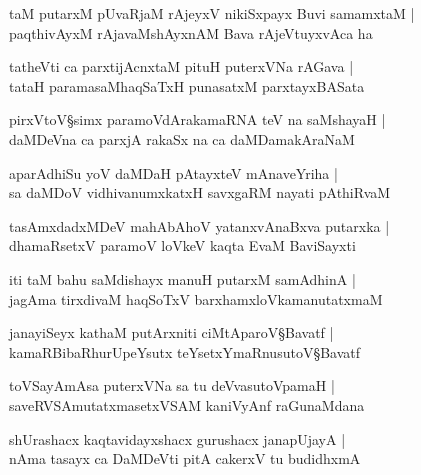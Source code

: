 \begin{shloka}
taM putarxM pUvaRjaM rAjeyxV nikiSxpayx Buvi samamxtaM |\\
paqthivAyxM rAjavaMshAyxnAM Bava rAjeVtuyxvAca ha
\end{shloka}

\begin{shloka}
tatheVti ca parxtijAcnxtaM  pituH puterxVNa rAGava |\\
tataH paramasaMhaqSaTxH punasatxM parxtayxBASata
\end{shloka}

\begin{shloka}
pirxVtoV\S simx paramoVdArakamaRNA teV na saMshayaH |\\
daMDeVna ca parxjA rakaSx na ca daMDamakAraNaM
\end{shloka}

\begin{shloka}
aparAdhiSu yoV daMDaH pAtayxteV mAnaveYriha |\\
sa daMDoV vidhivanumxkatxH savxgaRM nayati pAthiRvaM 
\end{shloka}

\begin{shloka}
tasAmxdadxMDeV mahAbAhoV yatanxvAnaBxva putarxka |\\
dhamaRsetxV paramoV loVkeV kaqta EvaM BaviSayxti
\end{shloka}

\begin{shloka}
iti taM bahu saMdishayx manuH putarxM samAdhinA |\\
jagAma tirxdivaM haqSoTxV barxhamxloVkamanutatxmaM 
\end{shloka}

\begin{shloka}
janayiSeyx kathaM putArxniti ciMtAparoV\S Bavatf  |\\
kamaRBibaRhurUpeYsutx teYsetxYmaRnusutoV\S Bavatf
\end{shloka}

\begin{shloka}
toVSayAmAsa puterxVNa sa tu deVvasutoVpamaH |\\
saveRVSAmutatxmasetxVSAM kaniVyAnf raGunaMdana
\end{shloka}

\begin{shloka}
shUrashacx kaqtavidayxshacx gurushacx janapUjayA |\\
nAma tasayx ca DaMDeVti pitA cakerxV tu budidhxmA\R
\end{shloka}


